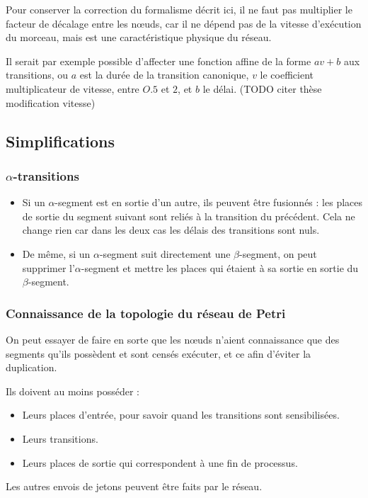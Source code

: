 Pour conserver la correction du formalisme décrit ici, il ne faut pas multiplier le facteur de décalage entre les nœuds, car il ne dépend pas de la vitesse d'exécution du morceau, mais est une caractéristique physique du réseau.

Il serait par exemple possible d'affecter une fonction affine de la forme $av + b$ aux transitions, ou $a$ est la durée de la transition canonique, $v$ le coefficient multiplicateur de vitesse, entre $O.5$ et $2$, et $b$ le délai.
(TODO citer thèse modification vitesse)

\subsection{Simplifications}
\subsubsection{$\alpha$-transitions}
\begin{itemize}
\item Si un $\alpha$-segment est en sortie d'un autre, ils peuvent être fusionnés : les places de sortie du segment suivant sont reliés à la transition du précédent. Cela ne change rien car dans les deux cas les délais des transitions sont nuls.

\item De même, si un $\alpha$-segment suit directement une $\beta$-segment, on peut supprimer l'$\alpha$-segment et mettre les places qui étaient à sa sortie en sortie du $\beta$-segment.
\end{itemize}
\subsubsection{Connaissance de la topologie du réseau de Petri}
On peut essayer de faire en sorte que les nœuds n'aient connaissance que des segments qu'ils possèdent et sont censés exécuter, et ce afin d'éviter la duplication.

Ils doivent au moins posséder : 
\begin{itemize}
\item Leurs places d'entrée, pour savoir quand les transitions sont sensibilisées.
\item Leurs transitions.
\item Leurs places de sortie qui correspondent à une fin de processus.
\end{itemize}

Les autres envois de jetons peuvent être faits par le réseau.


